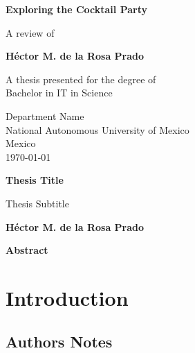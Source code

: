 \documentclass{book}
\begin{document}
\begin{titlepage}
    \begin{center}
        \vspace*{1cm}
 
        \Huge
        \textbf{Exploring the Cocktail Party}
 
        \vspace{0.5cm}
        \LARGE
        A review of 
 
        \vspace{1.5cm}
 
        \textbf{Héctor M. de la Rosa Prado}
 
        \vfill
 
        A thesis presented for the degree of\\
        Bachelor in IT in Science
 
        \vspace{0.8cm}
 
 
        \Large
        Department Name\\
        National Autonomous University of Mexico\\
        Mexico\\
        \today
 
    \end{center}
\end{titlepage}

\tableofcontents
\newpage

\thispagestyle{plain}
\begin{center}
    \Large
    \textbf{Thesis Title}
 
    \vspace{0.4cm}
    \large
    Thesis Subtitle
 
    \vspace{0.4cm}
    \textbf{Héctor M. de la Rosa Prado}
 
    \vspace{0.9cm}
    \textbf{Abstract}
\end{center}
\part{Introduction}
\chapter{Authors Notes}
\end{document}

